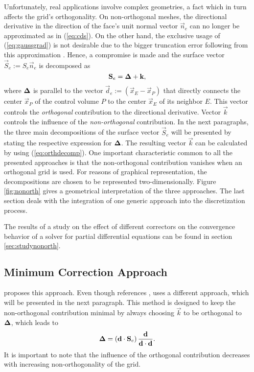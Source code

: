 Unfortunately, real applications involve complex geometries, a fact which in turn affects the grid's orthogonality. On non-orthogonal meshes, the directional derivative in the direction of the face's unit normal vector \(\vec{n}_e\) can no longer be approximated as in (\ref{eq:cds}). On the other hand, the exclusive usage of (\ref{eq:gaussgrad}) is not desirable due to the bigger truncation error following from this approximation \cite{jasak96}. Hence, a compromise is made and the surface vector \(\vec{S}_e := S_e \vec{n}_e\) is decomposed as
\begin{equation}
  \label{eq:orthdecomp}
  \mathbf{S}_e = \boldsymbol{\Delta} + \mathbf{k},
\end{equation}
where \(\boldsymbol{\Delta}\) is parallel to the vector \(\vec{d}_e := \left(\vec{x}_E - \vec{x}_P\right)\) that directly connects the center \(\vec{x}_P\) of the control volume \(P\) to the center \(\vec{x}_E\) of its neighbor \(E\). This vector controls the \emph{orthogonal} contribution to the directional derivative. Vector \(\vec{k}\) controls the influence of the \emph{non-orthogonal} contribution. In the next paragraphs, the three main decompositions of the surface vector \(\vec{S}_e\) will be presented by stating the respective expression for \(\boldsymbol{\Delta}\). The resulting vector \(\vec{k}\) can be calculated by using (\ref{eq:orthdecomp}). One important characteristic common to all the presented approaches is that the non-orthogonal contribution vanishes when an orthogonal grid is used. For reasons of graphical representation, the decompositions are chosen to be represented two-dimensionally. Figure \ref{fig:nonorth} gives a geometrical interpretation of the three approaches. The last section deals with the integration of one generic approach into the discretization process. 

The results of a study on the effect of different correctors on the convergence behavior of a solver for partial differential equations can be found in section \ref{sec:studynonorth}.

\subsection{Minimum Correction Approach}

\cite{muzaferja} proposes this approach. Even though \cite{ferziger02} references \cite{muzaferja}, \cite{ferziger02} uses a different approach, which will be presented in the next paragraph. This method is designed to keep the non-orthogonal contribution minimal by always choosing \(\vec{k}\) to be orthogonal to \(\boldsymbol{\Delta}\), which leads to
\begin{displaymath}
  \boldsymbol{\Delta} = \left( \mathbf{d} \cdot \mathbf{S}_e \right) \frac{\mathbf{d}}{\mathbf{d} \cdot \mathbf{d}}.
\end{displaymath}
It is important to note that the influence of the orthogonal contribution decreases with increasing non-orthogonality of the grid.

